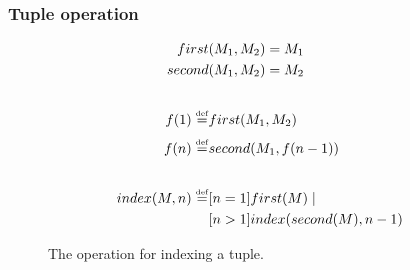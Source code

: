 \subsubsection{Tuple operation}

\begin{figure}[h]
\begin{center}
\begin{align*}
first&(M_1, M_2) = M_1\\
second&(M_1, M_2) = M_2\\
\\
f(1) \overset{\underset{\mathrm{def}}{}}{=} & first(M_1, M_2)\\
f(n) \overset{\underset{\mathrm{def}}{}}{=} & second(M_1, f(n-1))\\
\\
index(M, n) \overset{\underset{\mathrm{def}}{}}{=} &[n = 1]first(M)\mid \\
			&[n > 1]index(second(M), n-1)
\end{align*}
\end{center}
\caption{The operation for indexing a tuple.}
\end{figure}